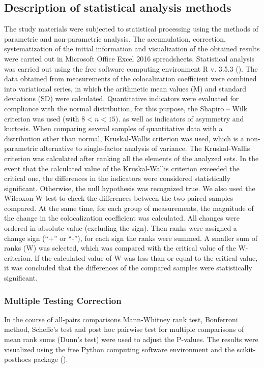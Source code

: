 \documentclass[english,authoryear]{elsarticle}
\begin{document}
\subsection{Description of statistical analysis methods}

The study materials were subjected to statistical processing using the methods of parametric and non-parametric analysis.
The accumulation, correction, systematization of the initial information and visualization of the obtained results were carried out in Microsoft Office Excel 2016 spreadsheets.
Statistical analysis was carried out using the free software computing environment R v. 3.5.3 (\cite{team2014r}).
The data obtained from measurements of the colocalization coefficient were combined into variational series, in which the arithmetic mean values (M) and standard deviations (SD) were calculated.
Quantitative indicators were evaluated for compliance with the normal distribution, for this purpose, the Shapiro – Wilk criterion  was used (with $8 < n < 15$).
as well as indicators of asymmetry and kurtosis.
When comparing several samples of quantitative data with a distribution other than normal, Kruskal-Wallis criterion was used, which is a non-parametric alternative to single-factor analysis of variance.
The Kruskal-Wallis criterion was calculated after ranking all the elements of the analyzed sets.
In the event that the calculated value of the Kruskal-Wallis criterion exceeded the critical one, the differences in the indicators were considered statistically significant.
Otherwise, the null hypothesis was recognized true.
We also used the Wilcoxon W-test to check the differences between the two paired samples compared.
At the same time, for each group of measurements, the magnitude of the change in the colocalization coefficient was calculated.
All changes were ordered in absolute value (excluding the sign). Then ranks were assigned a change sign (“+” or “-”), for each sign the ranks were summed.
A smaller sum of ranks (W) was selected, which was compared with the critical value of the W-criterion.
If the calculated value of W was less than or equal to the critical value, it was concluded that the differences of the compared samples were statistically significant.

\subsubsection{Multiple Testing Correction}

In the course of all-pairs comparisons Mann-Whitney rank test, Bonferroni method, Scheffe’s test and post hoc pairwise test for multiple comparisons of mean rank sums (Dunn’s test) were used to adjust the P-values. The results were visualized using the free Python computing software environment and the scikit-posthocs package (\cite{Terpilowski2019}).
\end{document}
